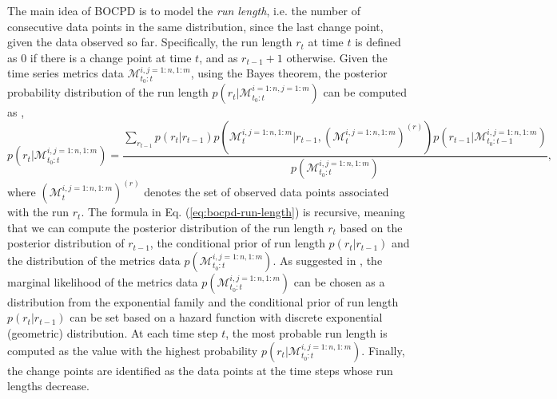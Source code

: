 The main idea of BOCPD is to model the \textit{run length}, i.e. the number of consecutive data points in the same distribution, since the last change point, given the data observed so far. Specifically, the run length $r_t$ at time $t$ is defined as $0$ if there is a change point at time $t$, and as $r_{t-1}+1$ otherwise. Given the time series metrics data $\mathcal{M}^{i,j=1:n,1:m}_{t_0:t}$, using the Bayes theorem, the posterior probability distribution of the run length $p(r_t \vert \mathcal{M}^{i=1:n,j=1:m}_{t_0:t})$ can be computed as \cite{adams2007bayesian},
\begin{equation} \label{eq:bocpd-run-length}
    p(r_t \vert \mathcal{M}^{i,j=1:n,1:m}_{t_0:t}) = \frac{\sum\nolimits_{r_{t-1}} p(r_t \vert r_{t-1}) p(\mathcal{M}^{i,j=1:n,1:m}_{t} \vert r_{t-1}, (\mathcal{M}^{i,j=1:n,1:m}_{t})^{(r)}) p(r_{t-1} \vert \mathcal{M}^{i,j=1:n,1:m}_{t_0:t-1})} {p(\mathcal{M}^{i,j=1:n,1:m}_{t_0:t})},
\end{equation}
where $(\mathcal{M}^{i,j=1:n,1:m}_{t})^{(r)}$ denotes the set of observed data points associated with the run $r_t$. The formula in Eq. (\ref{eq:bocpd-run-length}) is recursive, meaning that we can compute the posterior distribution of the run length $r_t$ based on the posterior distribution of $r_{t-1}$, the conditional prior of run length $p(r_t \vert r_{t-1})$ and the distribution of the metrics data $p(\mathcal{M}^{i,j=1:n,1:m}_{t_0:t})$. As suggested in \cite{adams2007bayesian}, the marginal likelihood of the metrics data $p(\mathcal{M}^{i,j=1:n,1:m}_{t_0:t})$ can be chosen as a distribution from the exponential family and the conditional prior of run length $p(r_t \vert r_{t-1})$ can be set based on a hazard function with discrete exponential (geometric) distribution. At each time step $t$, the most probable run length is computed as the value with the highest probability $p(r_t \vert \mathcal{M}^{i,j=1:n,1:m}_{t_0:t})$. Finally, the change points are identified as the data points at the time steps whose run lengths decrease.


